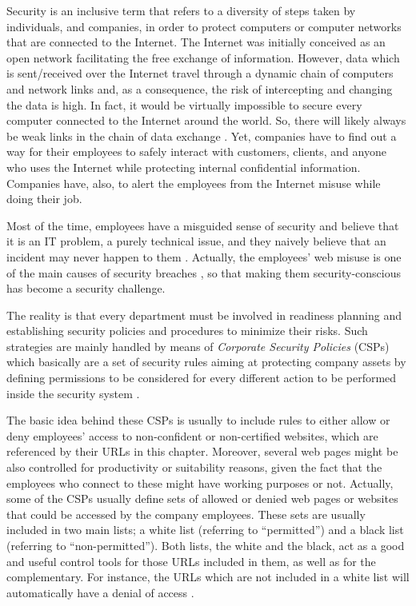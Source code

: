 \documentclass{llncs}
\begin{document}
\noindent Security is an inclusive term that refers to a diversity of steps taken by individuals, 
and companies, in order to protect computers or computer networks that are connected to the Internet. 
The Internet was initially conceived as an open network facilitating the free exchange of information. 
However, data which is sent/received over the Internet travel through a dynamic chain of computers and 
network links and, as a consequence, the risk of intercepting and changing the data is high. 
In fact, it would be virtually impossible to secure every computer connected to the Internet around the world. 
So, there will likely always be weak links in the chain of data exchange \cite{cheswick2003firewalls}. 
Yet, companies have to find out a way for their employees to safely interact with customers, clients, and anyone 
who uses the Internet while protecting internal confidential information. Companies have, also, to alert the employees 
from the Internet misuse while doing their job.
 
Most of the time, employees have a misguided sense of security and believe that it is an IT problem, a purely technical 
issue, and they naively believe that an incident may never happen to them \cite{stanton2005analysis}.  
Actually, the employees' web misuse is one of the main causes of  security breaches \cite{breivik2002abstract},  
so that making them security-conscious has become a security  challenge. 

The reality is that every department must be involved in  readiness planning and establishing security policies 
and procedures  to minimize their risks. Such strategies are mainly handled by 
means  of \textit{Corporate Security Policies} (CSPs) which basically are a  set of security rules aiming at 
protecting company assets by defining  permissions to be considered for every different action to be  performed 
inside the security system \cite{kaeo2003designing}.
 
The basic idea behind these CSPs is usually to include rules to either allow or deny employees' access to 
non-confident or non-certified websites, which are referenced by their URLs in this chapter. Moreover, several web pages 
might be also controlled for productivity  or suitability reasons, given the fact that the employees who connect  
to these might have working purposes or not. Actually, some of the  CSPs usually define sets of allowed or denied 
web pages or websites that could be accessed by the company employees. These sets are  usually included in two main 
lists; a white list (referring to  ``permitted'') and a black list (referring to  ``non-permitted''). 
Both lists, the white and the black, act as a  good and useful control tools for those URLs included in them, 
as  well as for the complementary. For instance, the URLs which are not included in a white list will automatically 
have a denial of  access \cite{ludl2007effectiveness}.
\end{document}
